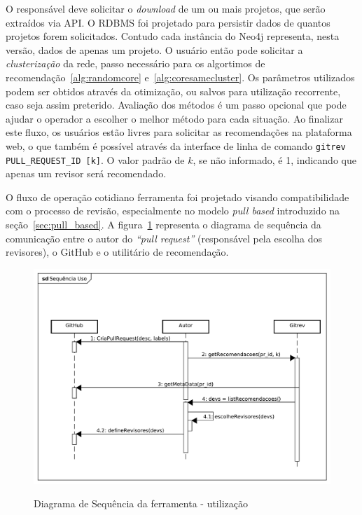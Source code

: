 \documentclass[12pt,openany,oneside,a4paper,english,brazil]{abntbibufjf}
\newcommand{\inlinecode}{\texttt}
\begin{document}
   O responsável deve solicitar o \textit{download} de um ou mais projetos, que serão extraídos via API. O RDBMS foi projetado para persistir dados de quantos projetos forem solicitados. Contudo cada instância do Neo4j representa, nesta versão, dados de apenas um projeto. O usuário então pode solicitar a \textit{clusterização} da rede, passo necessário para os algortimos de recomendação~\ref{alg:randomcore} e~\ref{alg:coresamecluster}. Os parâmetros utilizados podem ser obtidos através da otimização, ou salvos para utilização recorrente, caso seja assim preterido. Avaliação dos métodos é um passo opcional que pode ajudar o operador a escolher o melhor método para cada situação. Ao finalizar este fluxo, os usuários estão livres para solicitar as recomendações na plataforma web, o que também é possível através da interface de linha de comando \inlinecode{gitrev PULL\_REQUEST\_ID [k]}. O valor padrão de $k$, se não informado, é 1, indicando que apenas um revisor será recomendado.

   O fluxo de operação cotidiano ferramenta foi projetado visando compatibilidade com o processo de revisão, especialmente no modelo \textit{pull based} \cite{gousios2014} introduzido na seção~\ref{sec:pull_based}. A figura~\ref{fig:sequencia} representa o diagrama de sequência da comunicação entre o autor do \textit{``pull request''} (responsável pela escolha dos revisores), o GitHub e o utilitário de recomendação.

   \begin{figure}[!htbp]
    \includegraphics[width=\textwidth]{sequencia}\label{fig:sequencia}
    \caption{Diagrama de Sequência da ferramenta - utilização}
  \end{figure}
\end{document}
